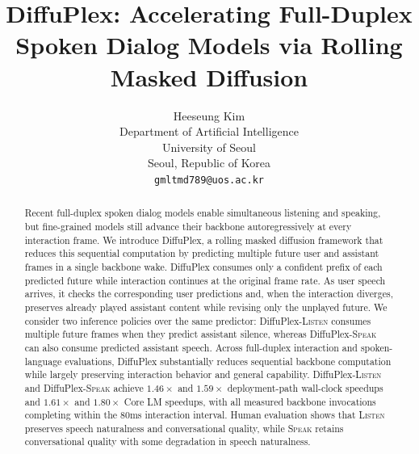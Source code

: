 \documentclass{article}
\title{DiffuPlex: Accelerating Full-Duplex Spoken Dialog Models via Rolling Masked Diffusion}
\author{Heeseung Kim \\
Department of Artificial Intelligence \\
University of Seoul \\
Seoul, Republic of Korea \\
\texttt{gmltmd789@uos.ac.kr}
}
\begin{document}
\maketitle
{}

\begin{abstract}
Recent full-duplex spoken dialog models enable simultaneous listening and speaking, but fine-grained models still advance their backbone autoregressively at every interaction frame.
We introduce DiffuPlex, a rolling masked diffusion framework that reduces this sequential computation by predicting multiple future user and assistant frames in a single backbone wake.
DiffuPlex consumes only a confident prefix of each predicted future while interaction continues at the original frame rate.
As user speech arrives, it checks the corresponding user predictions and, when the interaction diverges, preserves already played assistant content while revising only the unplayed future.
We consider two inference policies over the same predictor: DiffuPlex-\textsc{Listen} consumes multiple future frames when they predict assistant silence, whereas DiffuPlex-\textsc{Speak} can also consume predicted assistant speech.
Across full-duplex interaction and spoken-language evaluations, DiffuPlex substantially reduces sequential backbone computation while largely preserving interaction behavior and general capability.
DiffuPlex-\textsc{Listen} and DiffuPlex-\textsc{Speak} achieve $1.46\times$ and $1.59\times$ deployment-path wall-clock speedups and $1.61\times$ and $1.80\times$ Core LM speedups, with all measured backbone invocations completing within the 80ms interaction interval.
Human evaluation shows that \textsc{Listen} preserves speech naturalness and conversational quality, while \textsc{Speak} retains conversational quality with some degradation in speech naturalness.
\end{abstract}
















\appendix


\end{document}
